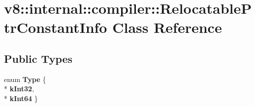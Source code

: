 \hypertarget{classv8_1_1internal_1_1compiler_1_1_relocatable_ptr_constant_info}{}\section{v8\+:\+:internal\+:\+:compiler\+:\+:Relocatable\+Ptr\+Constant\+Info Class Reference}
\label{classv8_1_1internal_1_1compiler_1_1_relocatable_ptr_constant_info}
\subsection*{Public Types}
\begin{DoxyCompactItemize}
\item 
enum {\bfseries Type} \{ \\*
{\bfseries k\+Int32}, 
\\*
{\bfseries k\+Int64}
 \}\hypertarget{classv8_1_1internal_1_1compiler_1_1_relocatable_ptr_constant_info_a249b0134162750cb15516a3db3f8a131}{}\label{classv8_1_1internal_1_1compiler_1_1_relocatable_ptr_constant_info_a249b0134162750cb15516a3db3f8a131}

\end{DoxyCompactItemize}
